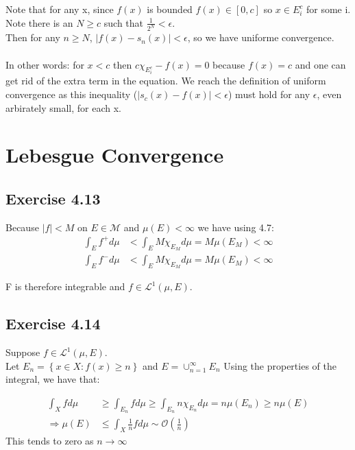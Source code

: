 \documentclass[11pt]{article}
\numberwithin{equation}{section}
\theoremstyle{plain}
\theoremstyle{definition}
\newcommand\braces[1]{\left\{ #1 \right\}}
\newcommand\abs[1]{\left| #1 \right|}
\def\imp{\Rightarrow}
\newcommand{\1}{\mathbbm 1}
\newcommand{\oO}{\mathcal O}
\begin{document}
\noindent Note that for any x, since $f(x)$ is bounded $f(x) \in [0,c]$ so $x \in E_{i}^{c}$ for some i. Note there is an $N \geq c$ such that $\frac{1}{2^{N}}< \epsilon$. 
\\
 Then for any $n \geq N$, $\left|f(x)-s_{n}(x)\right|<\epsilon$, so we have uniforme convergence.
 \\
 \\
 In other words: for $x<c$ then $c \chi_{E_{i}^{c}} - f(x) = 0$ because $f(x)=c$ and one can get rid of the extra term in the equation. 
 We reach the definition of uniform convergence as this inequality ($\abs{s_c(x) - f(x)} < \epsilon$) must hold for any $\epsilon$, even arbirately small, for each x.

\section*{Lebesgue Convergence}

\subsection*{Exercise 4.13}
Because $|f|<M \text { on } E \in \mathcal{M}$ and $\mu(E)<\infty$ we have using 4.7:
\begin{align}
\int_{E} f^+ d \mu &< \int_{E} M \chi_{E_{M}} d \mu = M \mu (E_M) < \infty \\
\int_{E} f^- d \mu &< \int_{E} M \chi_{E_{M}} d \mu = M \mu (E_M) < \infty
\end{align}

F is therefore integrable and $f \in \mathscr{L}^{1}(\mu, E)$.

\subsection*{Exercise 4.14}

Suppose $f \in \mathscr{L}^{1}(\mu, E)$. \\
Let $ E_n = \braces{x \in X: f(x) \geq n}$ and $E = \cup^{\infty}_{n=1} E_n$ Using the properties of the integral, we have that:

\begin{align}
\int_{X} f d \mu &\geq \int_{E_n} f d \mu \geq \int_{E_n} n \chi_{E_{n}} d \mu = n \mu(E_n) \geq n \mu(E) \\
\imp \mu(E) &\leq \int_{X} \frac{1}{n} f d \mu \sim \oO (\frac{1}{n})
\end{align}
This tends to zero as $n \to \infty$
\end{document}
